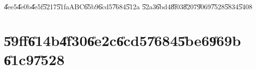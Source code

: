 \documentclass[12pt,a4paper]{article}
\begin{document}
\U{4ee5}\U{4e0b}\U{4e5f}\U{5217}\U{51fa}ABC\U{65b9}\U{6cd5}\U{7684}\U{512a}%
\U{52a3}\U{6bd4}\U{8f03}\U{8207}\U{9069}\U{7528}\U{5834}\U{5408}

%
\begin{center}

\end{center}%

%

\part{\U{59ff}\U{614b}\U{4f30}\U{6e2c}\U{6cd5}\U{7684}\U{5be6}\U{969b}%
\U{61c9}\U{7528}}

\setcounter{page}{1}
\end{document}
